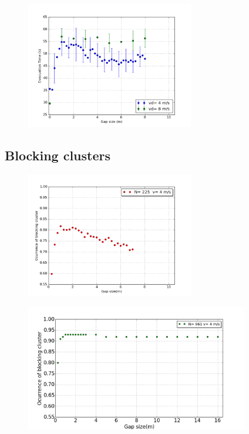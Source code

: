\begin{figure}[H]
    \centering
    \includegraphics[height=5.5cm]{figuras/gap_vste_v4_v8.png}
    \caption[width=5cm]{\centering\textit{}}
    \label{sintesis}
\end{figure}




\subsection{Blocking clusters}

\begin{figure}[H]
    \centering
    \includegraphics[height=5.5cm]{figuras/proba_vsgap_small_225p_v4.png}
    \caption[width=5cm]{\centering\textit{}}
    \label{sintesis}
\end{figure}

\begin{figure}[H]
    \centering
    \includegraphics[height=5.5cm]{figuras/proba_vsgap_small_961p_v4.png}
    \caption[width=5cm]{\centering\textit{}}
    \label{sintesis}
\end{figure}

